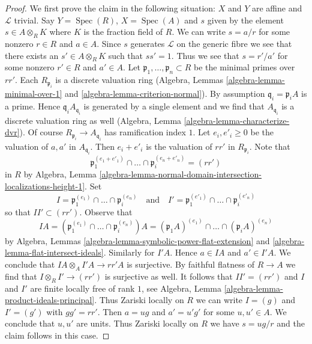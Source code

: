 \documentclass[10pt,a4paper]{amsart}
\theoremstyle{plain}
\theoremstyle{definition}
\theoremstyle{remark}
\numberwithin{equation}{subsection}
\def\Spec{\mathop{\mathrm{Spec}}}
\begin{document}
\begin{proof}
\medskip\noindent
We first prove the claim in the following situation:
$X$ and $Y$ are affine and $\mathcal{L}$ trivial. Say $Y = \Spec(R)$,
$X = \Spec(A)$ and $s$ given by the element $s \in A \otimes_R K$
where $K$ is the fraction field of $R$. We can write $s = a/r$
for some nonzero $r \in R$ and $a \in A$. Since $s$ generates $\mathcal{L}$
on the generic fibre we see that there exists an $s' \in A \otimes_R K$
such that $ss' = 1$. Thus we see that $s = r'/a'$ for some
nonzero $r' \in R$ and $a' \in A$. Let
$\mathfrak p_1, \ldots, \mathfrak p_n \subset R$
be the minimal primes over $rr'$. Each $R_{\mathfrak p_i}$
is a discrete valuation ring
(Algebra, Lemmas \ref{algebra-lemma-minimal-over-1} and
\ref{algebra-lemma-criterion-normal}). By assumption
$\mathfrak q_i = \mathfrak p_i A$ is a prime. Hence
$\mathfrak q_i A_{\mathfrak q_i}$ is generated by a single element
and we find that $A_{\mathfrak q_i}$ is a discrete valuation ring as
well (Algebra, Lemma \ref{algebra-lemma-characterize-dvr}). Of course
$R_{\mathfrak p_i} \to A_{\mathfrak q_i}$ has ramification index $1$.
Let $e_i, e'_i \geq 0$ be the  valuation of $a, a'$ in $A_{\mathfrak q_i}$.
Then $e_i + e'_i$ is the valuation of $rr'$ in $R_{\mathfrak p_i}$. Note that
$$
\mathfrak p_1^{(e_1 + e'_1)} \cap \ldots \cap \mathfrak p_i^{(e_n + e'_n)} =
(rr')
$$
in $R$ by Algebra, Lemma
\ref{algebra-lemma-normal-domain-intersection-localizations-height-1}.
Set
$$
I = \mathfrak p_1^{(e_1)} \cap \ldots \cap \mathfrak p_i^{(e_n)}
\quad\text{and}\quad
I' = \mathfrak p_1^{(e'_1)} \cap \ldots \cap \mathfrak p_i^{(e'_n)}
$$
so that $II' \subset (rr')$. Observe that
$$
IA =
(\mathfrak p_1^{(e_1)} \cap \ldots \cap \mathfrak p_i^{(e_n)})A =
(\mathfrak p_1A)^{(e_1)} \cap \ldots \cap (\mathfrak p_i A)^{(e_n)}
$$
by Algebra, Lemmas \ref{algebra-lemma-symbolic-power-flat-extension} and
\ref{algebra-lemma-flat-intersect-ideals}. Similarly for $I'A$. Hence
$a \in IA$ and $a' \in I'A$.
We conclude that $IA \otimes_A I'A \to rr'A$ is surjective.
By faithful flatness of $R \to A$ we find that
$I \otimes_R I' \to (rr')$ is surjective as well.
It follows that $II' = (rr')$ and $I$ and $I'$ are finite locally
free of rank $1$, see
Algebra, Lemma \ref{algebra-lemma-product-ideals-principal}.
Thus Zariski locally on $R$ we can write $I = (g)$ and $I' = (g')$
with $gg' = rr'$. Then $a = ug$ and $a' = u'g'$ for some $u, u' \in A$.
We conclude that $u, u'$ are units. Thus Zariski locally on $R$
we have $s = ug/r$ and the claim follows in this case.


\end{proof}
\end{document}
